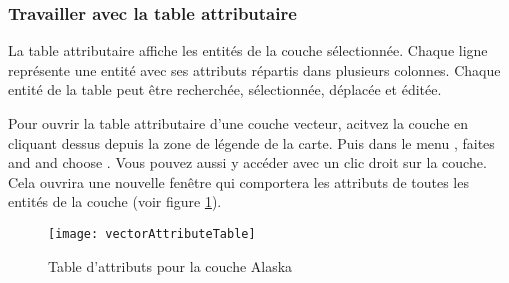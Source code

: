 \begin{itemize}
\subsubsection{Travailler avec la table attributaire}\label{sec:attribute table}

La table attributaire affiche les entités de la couche sélectionnée. Chaque ligne représente une entité avec ses attributs répartis dans  plusieurs colonnes. Chaque entité de la table peut être recherchée, sélectionnée, déplacée et éditée.

Pour ouvrir la table attributaire d'une couche vecteur, acitvez la couche en cliquant dessus depuis la zone de légende de la carte. Puis dans le menu  , faites and and choose . Vous pouvez aussi y accéder avec un clic droit sur la couche. Cela ouvrira une nouvelle fenêtre qui comportera les attributs de toutes les entités de la couche (voir figure \ref{fig:attributetable}).

\begin{figure}[ht]
   \begin{center}
   \caption{Table d'attributs pour la couche Alaska \nixcaption}\label{fig:attributetable}\smallskip
   \texttt{[image: vectorAttributeTable]}
\end{center} 
\end{figure}



\end{itemize}
